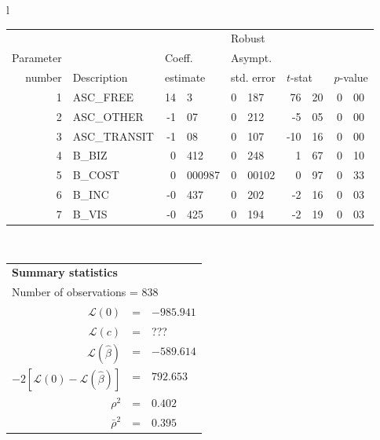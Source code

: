   \begin{tabular}{l}
\begin{tabular}{rlr@{.}lr@{.}lr@{.}lr@{.}l}
         &                       &   \multicolumn{2}{l}{}    & \multicolumn{2}{l}{Robust}  &     \multicolumn{4}{l}{}   \\
Parameter &                       &   \multicolumn{2}{l}{Coeff.}      & \multicolumn{2}{l}{Asympt.}  &     \multicolumn{4}{l}{}   \\
number &  Description                     &   \multicolumn{2}{l}{estimate}      & \multicolumn{2}{l}{std. error}  &   \multicolumn{2}{l}{$t$-stat}  &   \multicolumn{2}{l}{$p$-value}   \\

\hline

1 & ASC\_FREE & 14&3 & 0&187 & 76&20 & 0&00 \\
2 & ASC\_OTHER & -1&07 & 0&212 & -5&05 & 0&00 \\
3 & ASC\_TRANSIT & -1&08 & 0&107 & -10&16 & 0&00 \\
4 & B\_BIZ & 0&412 & 0&248 & 1&67 & 0&10 \\
5 & B\_COST & 0&000987 & 0&00102 & 0&97 & 0&33 \\
6 & B\_INC & -0&437 & 0&202 & -2&16 & 0&03 \\
7 & B\_VIS & -0&425 & 0&194 & -2&19 & 0&03 \\
\hline

\end{tabular}
\\
\begin{tabular}{rcl}
\multicolumn{3}{l}{\bf Summary statistics}\\
\multicolumn{3}{l}{ Number of observations = $838$} \\
 $\mathcal{L}(0)$ &=&  $-985.941$ \\
 $\mathcal{L}(c)$ &=& ???\\
 $\mathcal{L}(\hat{\beta})$ &=& $-589.614 $  \\
 $-2[\mathcal{L}(0) -\mathcal{L}(\hat{\beta})]$ &=& $792.653$ \\
    $\rho^2$ &=&   $0.402$ \\
    $\bar{\rho}^2$ &=&    $0.395$ \\
\end{tabular}
\end{tabular}

